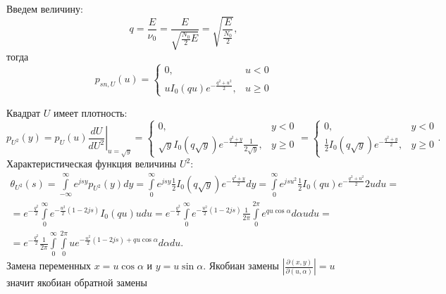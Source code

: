 \documentclass[a4paper,12pt]{article}
\newcommand{\modulus}[1]{\left | #1 \right |}
\begin{document}
    Введем величину:
    \[
        q
        = \frac{E}{\nu_0}
        = \frac{E}{\sqrt{\frac{N_0}{2} E}}
        = \sqrt{\frac{E}{\frac{N_0}{2}}},
    \]
    тогда
    \[
        p_{sn,U}(u)
        = \left \{
        \begin{array}{ll}
            0,                                    & u < 0   \\
            u I_0(qu) e^{- \frac{q^2 + u^2}{2}} , & u \ge 0
        \end{array}
        \right .
    \]

    Квадрат $U$ имеет плотность:
    \[
        p_{U^2}(y)
        = p_U(u) \left . \frac{dU}{dU^2} \right |_{u = \sqrt{y}}
        = \left \{
        \begin{array}{ll}
            0 ,                                                                    & y < 0   \\
            \sqrt{y} I_0(q \sqrt{y}) e^{- \frac{q^2 + y}{2}} \frac{1}{2 \sqrt{y}}, & y \ge 0
        \end{array}
        \right .
        = \left \{
        \begin{array}{ll}
            0 ,                                                  & y < 0   \\
            \frac{1}{2} I_0(q \sqrt{y}) e^{- \frac{q^2 + y}{2}}, & y \ge 0
        \end{array}
        \right .
        .
    \]
    Характеристическая функция величины $U^2$:
    \begin{multline*}
        \theta_{U^2}(s)
        = \int \limits_{- \infty}^{\infty} e^{j s y} p_{U^2}(y) dy
        = \int \limits_{0}^{\infty} e^{j s y} \frac{1}{2} I_0(q \sqrt{y}) e^{- \frac{q^2 + y}{2}} dy
        = \int \limits_{0}^{\infty} e^{j s u^2} \frac{1}{2} I_0(q u) e^{- \frac{q^2 + u^2}{2}} 2 u du = \\
        = e^{- \frac{q^2}{2}} \int \limits_{0}^{\infty} e^{- \frac{u^2}{2} ( 1 - 2 j s)} I_0(q u) u du
        = e^{- \frac{q^2}{2}} \int \limits_{0}^{\infty} e^{- \frac{u^2}{2} ( 1 - 2 j s)} \frac{1}{2 \pi} \int \limits_0^{2 \pi} e^{q u \cos \alpha} d \alpha u du = \\
        = e^{- \frac{q^2}{2}} \frac{1}{2 \pi} \int \limits_{0}^{\infty} \int \limits_0^{2 \pi} u e^{- \frac{u^2}{2} ( 1 - 2 j s) + q u \cos \alpha} d \alpha du .
    \end{multline*}
    Замена переменных $x = u \cos \alpha$ и $y = u \sin \alpha$. Якобиан замены $\modulus{\frac{\partial (x,y)}{\partial (u,\alpha)}} = u$ значит якобиан обратной замены
\end{document}
